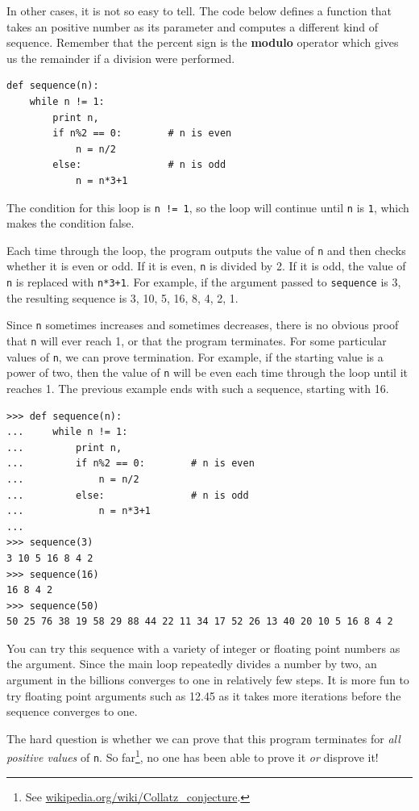 \documentclass[10pt]{book}
\begin{document}
In other cases, it is not so easy to tell.  The code below defines a function
that takes an positive number as its parameter and computes a different 
kind of sequence.
Remember that the percent sign is the {\bf modulo} operator which gives us the
remainder if a division were performed.

\beforeverb
\begin{verbatim}
def sequence(n):
    while n != 1:
        print n,
        if n%2 == 0:        # n is even
            n = n/2
        else:               # n is odd
            n = n*3+1
\end{verbatim}
\afterverb
%
The condition for this loop is {\tt n != 1}, so the loop will continue
until {\tt n} is {\tt 1}, which makes the condition false.

Each time through the loop, the program outputs the value of {\tt n}
and then checks whether it is even or odd.  If it is even, {\tt n} is 
divided by 2.  If it is odd, the value of {\tt n} is replaced with
{\tt n*3+1}. For example, if the argument passed
to {\tt sequence} is 3, the resulting sequence is 3, 10, 5, 16, 8, 4, 2, 1.

Since {\tt n} sometimes increases and sometimes decreases, there is no
obvious proof that {\tt n} will ever reach 1, or that the program
terminates.  For some particular values of {\tt n}, we can prove
termination.  For example, if the starting value is a power of two,
then the value of {\tt n} will be even each time through the loop
until it reaches 1. The previous example ends with such a sequence,
starting with 16.

\beforeverb
\begin{verbatim}
>>> def sequence(n):
...     while n != 1:
...         print n,
...         if n%2 == 0:        # n is even
...             n = n/2
...         else:               # n is odd
...             n = n*3+1
... 
>>> sequence(3)
3 10 5 16 8 4 2
>>> sequence(16)
16 8 4 2
>>> sequence(50)
50 25 76 38 19 58 29 88 44 22 11 34 17 52 26 13 40 20 10 5 16 8 4 2
\end{verbatim}
\afterverb
%
You can try this sequence with a variety of integer or floating 
point numbers as the argument.  
Since the main loop repeatedly divides a number
by two, an argument in the billions converges to one in 
relatively few steps.  
It is more fun to try floating point arguments 
such as 12.45 as it takes more iterations before the sequence
converges to one.

The hard question is whether we can prove that this program terminates
for {\em all positive values} of {\tt n}.  So far\footnote{See
  \url{wikipedia.org/wiki/Collatz_conjecture}.}, no one has
been able to prove it {\em or} disprove it!
\end{document}
